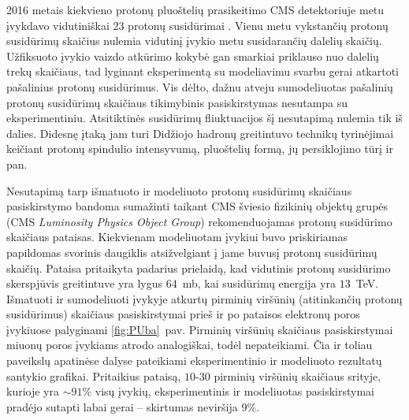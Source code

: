 \documentclass[a4paper, 12pt, oneside]{article}
\begin{document}
2016 metais kiekvieno protonų pluoštelių prasikeitimo CMS detektoriuje metu įvykdavo vidutiniškai 23 protonų
susidūrimai \cite{CMSLumi}.
Vienu metu vykstančių protonų susidūrimų skaičius nulemia vidutinį įvykio metu susidarančių dalelių skaičių.
Užfiksuoto įvykio vaizdo atkūrimo kokybė gan smarkiai priklauso nuo dalelių trekų skaičiaus, tad lyginant
eksperimentą su modeliavimu svarbu gerai atkartoti pašalinius protonų susidūrimus.
Vis dėlto, dažnu atveju sumodeliuotas pašalinių protonų susidūrimų skaičiaus tikimybinis pasiskirstymas
nesutampa su eksperimentiniu.
Atsitiktinės susidūrimų fliuktuacijos šį nesutapimą nulemia tik iš dalies.
Didesnę įtaką jam turi Didžiojo hadronų greitintuvo technikų tyrinėjimai keičiant protonų spindulio intensyvumą,
pluoštelių formą, jų persiklojimo tūrį ir pan.

Nesutapimą tarp išmatuoto ir modeliuoto protonų susidūrimų skaičiaus pasiskirstymo bandoma sumažinti taikant
CMS šviesio fizikinių objektų grupės (CMS \textit{Luminosity Physics Object Group}) rekomenduojamas protonų
susidūrimo skaičiaus pataisas.
Kiekvienam modeliuotam įvykiui buvo priskiriamas papildomas svorinis daugiklis atsižvelgiant į jame buvusį protonų
susidūrimų skaičių.
Pataisa pritaikyta padarius prielaidą, kad vidutinis protonų susidūrimo skerspjūvis greitintuve yra lygus $64$~mb,
kai susidūrimų energija yra $13$~TeV.
Išmatuoti ir sumodeliuoti įvykyje atkurtų pirminių viršūnių (atitinkančių protonų susidūrimus) skaičiaus pasiskirstymai
prieš ir po pataisos elektronų poros įvykiuose palyginami \ref{fig:PUba}~pav.
Pirminių viršūnių skaičiaus pasiskirstymai miuonų poros įvykiams atrodo analogiškai, todėl nepateikiami.
Čia ir toliau paveikslų apatinėse dalyse pateikiami eksperimentinio ir modeliuoto rezultatų santykio grafikai.
Pritaikius pataisą, $10$-$30$ pirminių viršūnių skaičiaus srityje, kurioje yra $\sim\!91\%$ visų įvykių,
eksperimentinis ir modeliuotas pasiskirstymai pradėjo sutapti labai gerai -- skirtumas neviršija $9\%$.
\end{document}
